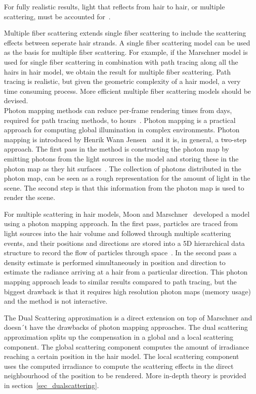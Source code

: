 \documentclass[11pt,a4paper]{report}
\begin{document}
For fully realistic results, light that reflects from hair to hair, or multiple scattering, must be accounted for~\cite{ward}.

Multiple fiber scattering extends single fiber scattering to include the scattering effects between seperate hair strands. A single fiber scattering model can be used as the basis for multiple fiber scattering. For example, if the Marschner model is used for single fiber scattering in combination with path tracing along all the hairs in hair model, we obtain the result for multiple fiber scattering. Path tracing is realistic, but given the geometric complexity of a hair model, a very time consuming process. More efficient multiple fiber scattering models should be devised.\\

Photon mapping methods can reduce per-frame rendering times from days, required for path tracing methods, to hours~\cite{ward}. Photon mapping is a practical approach for computing global illumination in complex environments. Photon mapping is introduced by Henrik Wann Jensen~\cite{jensen} and it is, in general, a two-step approach.
The first pass in the method is constructing the photon map by emitting photons from the light sources in the model and storing these in the photon map as they hit surfaces~\cite{jensen}. The collection of photons distributed in the photon map, can be seen as a rough representation for the amount of light in the scene. The second step is that this information from the photon map is used to render the scene.

For multiple scattering in hair models, Moon and Marschner~\cite{moon} developed a model using a photon mapping approach. In the first pass, particles are traced from light sources into the hair volume and followed through multiple scattering events, and their positions and directions are stored into a 5D hierarchical data structure to record the flow of particles through space~\cite{moon}. In the second pass a density estimate is performed simultaneously in position and direction to estimate the radiance arriving at a hair from a particular direction.  This photon mapping approach leads to similar results compared to path tracing, but the biggest drawback is that it requires high resolution photon maps (memory usage) and the method is not interactive.

The Dual Scattering approximation is a direct extension on top of Marschner and doesn´t have the drawbacks of photon mapping approaches. The dual scattering approximation splits up the compensation in a global and a local scattering component. The global scattering component computes the amount of irradiance reaching a certain position in the hair model. The local scattering component uses the computed irradiance to compute the scattering effects in the direct neighbourhood of the position to be rendered. More in-depth theory is provided in section~\ref{sec_dualscattering}.
\end{document}

